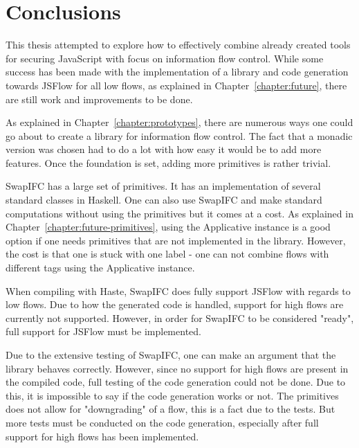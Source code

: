 \chapter{Conclusions}
This thesis attempted to explore how to effectively combine already created tools for securing JavaScript with focus on information flow control. While some success has been made with the implementation of a library and code generation towards JSFlow for all low flows, as explained in Chapter~\ref{chapter:future}, there are still work and improvements to be done.

As explained in Chapter~\ref{chapter:prototypes}, there are numerous ways one could go about to create a library for information flow control. The fact that a monadic version was chosen had to do a lot with how easy it would be to add more features. Once the foundation is set, adding more primitives is rather trivial.

SwapIFC has a large set of primitives. It has an implementation of several standard classes in Haskell. One can also use SwapIFC and make standard computations without using the primitives but it comes at a cost. As explained in Chapter~\ref{chapter:future-primitives}, using the Applicative instance is a good option if one needs primitives that are not implemented in the library. However, the cost is that one is stuck with one label - one can not combine flows with different tags using the Applicative instance.

When compiling with Haste, SwapIFC does fully support JSFlow with regards to low flows. Due to how the generated code is handled, support for high flows are currently not supported. However, in order for SwapIFC to be considered "ready", full support for JSFlow must be implemented.

Due to the extensive testing of SwapIFC, one can make an argument that the library behaves correctly. However, since no support for high flows are present in the compiled code, full testing of the code generation could not be done. Due to this, it is impossible to say if the code generation works or not. The primitives does not allow for "downgrading" of a flow, this is a fact due to the tests. But more tests must be conducted on the code generation, especially after full support for high flows has been implemented.

